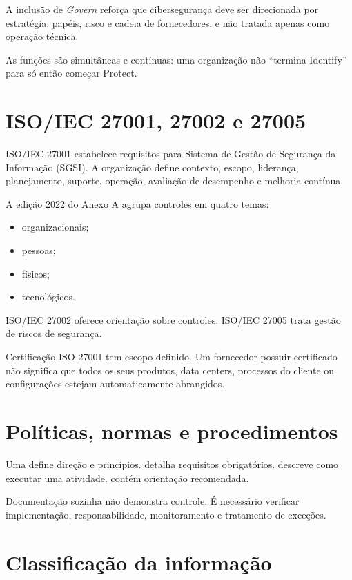 A inclusão de \emph{Govern} reforça que cibersegurança deve ser direcionada por estratégia, papéis, risco e cadeia de fornecedores, e não tratada apenas como operação técnica.

As funções são simultâneas e contínuas: uma organização não ``termina Identify'' para só então começar Protect.

\section{ISO/IEC 27001, 27002 e 27005}

ISO/IEC 27001 estabelece requisitos para Sistema de Gestão de Segurança da Informação (SGSI). A organização define contexto, escopo, liderança, planejamento, suporte, operação, avaliação de desempenho e melhoria contínua.

A edição 2022 do Anexo A agrupa controles em quatro temas:
\begin{itemize}
\item organizacionais;
\item pessoas;
\item físicos;
\item tecnológicos.
\end{itemize}

ISO/IEC 27002 oferece orientação sobre controles. ISO/IEC 27005 trata gestão de riscos de segurança.

\begin{atencao}
Certificação ISO 27001 tem escopo definido. Um fornecedor possuir certificado não significa que todos os seus produtos, data centers, processos do cliente ou configurações estejam automaticamente abrangidos.
\end{atencao}

\section{Políticas, normas e procedimentos}

Uma  define direção e princípios.  detalha requisitos obrigatórios.  descreve como executar uma atividade.  contém orientação recomendada.

Documentação sozinha não demonstra controle. É necessário verificar implementação, responsabilidade, monitoramento e tratamento de exceções.

\section{Classificação da informação}

